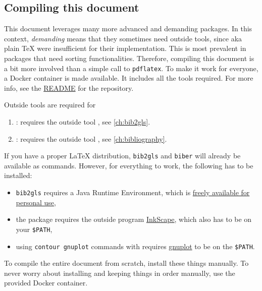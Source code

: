 \subsection*{Compiling this document}

This document leverages many more advanced and demanding packages.
In this context, \emph{demanding} means that they sometimes need outside tools,
since  aka plain \TeX{} were insufficient for their implementation.
This is most prevalent in packages that need sorting functionalities.
Therefore, compiling this document is a bit more involved than a simple call to
\texttt{pdflatex}.
To make it work for everyone, a Docker container is made available.
It includes all the tools required.
For more info, see the
\href{https://collaborating.tuhh.de/cap7863/latex-git-cookbook/-/blob/master/README.md}{README}
for the repository.

Outside tools are required for
\begin{enumerate}
    \item {}: requires the outside tool
        , see \cref{ch:bib2gls}.
    \item {}: requires the outside tool ,
        see \cref{ch:bibliography}.
\end{enumerate}
If you have a proper \LaTeX{} distribution, \texttt{bib2gls} and \texttt{biber}
will already be available as commands.
However, for everything to work, the following has to be installed:
\begin{itemize}
    \item \texttt{bib2gls} requires a Java Runtime Environment, which is
        \href{https://www.java.com/en/download/}{freely available for personal use},
    \item the  package requires the outside program
        \href{https://inkscape.org/}{InkScape}, which also has to be on your
        \texttt{\$PATH},
    \item using \texttt{contour gnuplot} commands with  requires
        \href{http://www.gnuplot.info/download.html}{gnuplot} to be on the \texttt{\$PATH}.
\end{itemize}

To compile the entire document from scratch, install these things manually.
To never worry about installing and keeping things in order manually, use the provided
Docker container.

